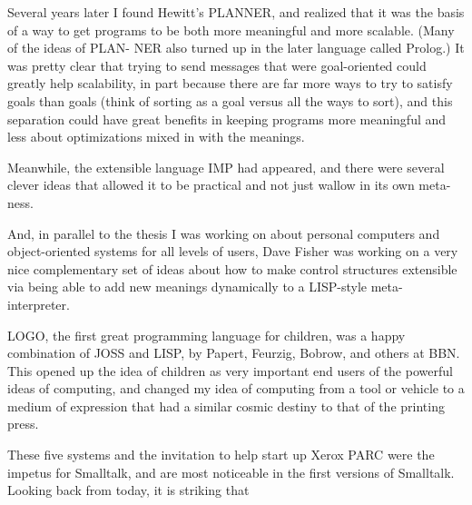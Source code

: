 \documentclass[a4paper,10pt,twoside]{book}
\begin{document}
Several years later I found Hewitt’s PLANNER, and realized that it was the basis of a way to get programs to be both more meaningful and more scalable. (Many of the ideas of PLAN- 
NER also turned up in the later language called Prolog.) It was pretty clear that trying to send 
messages that were goal-oriented could greatly help scalability, in part because there are far more ways to try to satisfy goals than goals (think of sorting as a goal versus all the ways to 
sort), and this separation could have great benefits in keeping programs more meaningful 
and less about optimizations mixed in with the meanings. 


Meanwhile, the extensible language IMP had appeared, and there were several clever 
ideas that allowed it to be practical and not just wallow in its own meta-ness. 


And, in parallel to the thesis I was working on about personal computers and object-oriented 
systems for all levels of users, Dave Fisher was working on a very nice complementary set of ideas 
about how to make control structures extensible via being able to add new meanings dynamically 
to a LISP-style meta-interpreter. 


LOGO, the first great programming language for children, was a happy combination of 
JOSS and LISP, by Papert, Feurzig, Bobrow, and others at BBN. This opened up the idea of children as very important end users of the powerful ideas of computing, and changed my idea of 
computing from a tool or vehicle to a medium of expression that had a similar cosmic destiny 
to that of the printing press. 


These five systems and the invitation to help start up Xerox PARC were the impetus for 
Smalltalk, and are most noticeable in the first versions of Smalltalk. 
Looking back from today, it is striking that 
\end{document}
